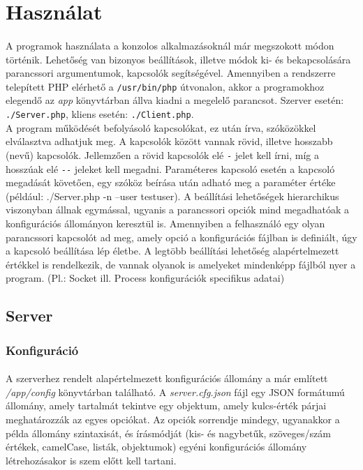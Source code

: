 \documentclass[12pt]{report}
\begin{document}
\section{Használat}
\paragraph{}
A programok használata a konzolos alkalmazásoknál már megszokott módon történik. Lehetőség van bizonyos beállítások, illetve módok ki- és bekapcsolására parancssori argumentumok, kapcsolók segítségével. Amennyiben a rendszerre telepített PHP elérhető a \verb|/usr/bin/php| útvonalon, akkor a programokhoz elegendő az \textit{app} könyvtárban állva kiadni a megelelő parancsot. Szerver esetén: \verb|./Server.php|, kliens esetén: \verb|./Client.php|. \\
A program működését befolyásoló kapcsolókat, ez után írva, szóközökkel elválasztva adhatjuk meg. A kapcsolók között vannak rövid, illetve hosszabb (nevű) kapcsolók. Jellemzően a rövid kapcsolók elé \verb|-| jelet kell írni, míg a hosszúak elé \verb|--| jeleket kell megadni. Paraméteres kapcsoló esetén a kapcsoló megadását követően, egy szóköz beírása után adható meg a paraméter értéke (például: ./Server.php -n --user testuser).
A beállítási lehetőségek hierarchikus viszonyban állnak egymással, ugyanis a parancssori opciók mind megadhatóak a konfigurációs állományon keresztül is. Amennyiben a felhasználó egy olyan parancssori kapcsolót ad meg, amely opció a konfigurációs fájlban is definiált, úgy a kapcsoló beállítása lép életbe.  A legtöbb beállítási lehetőség alapértelmezett értékkel is rendelkezik, de vannak olyanok is amelyeket mindenképp fájlból nyer a program. (Pl.: Socket ill. Process konfigurációk specifikus adatai)
\subsection{Server}
  \subsubsection{Konfiguráció}
    \paragraph{}
  A szerverhez rendelt alapértelmezett konfigurációs állomány a már említett \textit{/app/config} könyvtárban található. A \textit{server.cfg.json} fájl egy JSON formátumú állomány, amely tartalmát tekintve egy objektum, amely kulcs-érték párjai meghatározzák az egyes opciókat. Az opciók sorrendje mindegy, ugyanakkor a példa állomány szintaxisát, és írásmódját (kis- és nagybetűk, szöveges/szám értékek,  camelCase, listák, objektumok) egyéni konfigurációs állomány létrehozásakor is szem előtt kell tartani.
\end{document}
